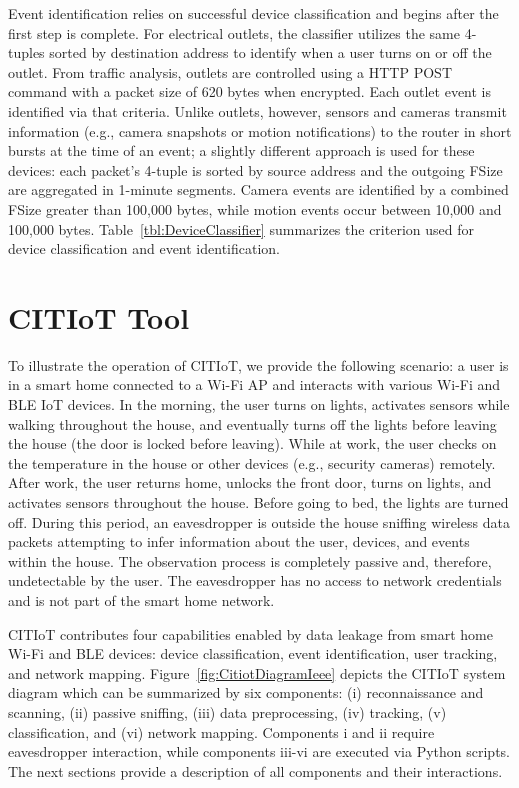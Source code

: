 \documentclass[journal]{./IEEEtran/IEEEtran}
\begin{document}
Event identification relies on successful device classification and begins after the first step is complete. For electrical outlets, the classifier utilizes the same 4-tuples sorted by destination address to identify when a user turns on or off the outlet. From traffic analysis, outlets are controlled using a HTTP POST command with a packet size of 620 bytes when encrypted. Each outlet event is identified via that criteria. Unlike outlets, however, sensors and cameras transmit information (e.g., camera snapshots or motion notifications) to the router in short bursts at the time of an event; a slightly different approach is used for these devices: each packet's 4-tuple is sorted by source address and the outgoing \ac{FSize} are aggregated in 1-minute segments. Camera events are identified by a combined \ac{FSize} greater than 100,000 bytes, while motion events occur between 10,000 and 100,000 bytes. Table~\ref{tbl:DeviceClassifier} summarizes the criterion used for device classification and event identification.

\tableDeviceClassifier

\section{\ac{CITIoT} Tool}\label{citiot}

To illustrate the operation of CITIoT, we provide the following scenario: a user is in a smart home connected to a Wi-Fi \ac{AP} and interacts with various Wi-Fi and \ac{BLE} \ac{IoT} devices. In the morning, the user turns on lights, activates sensors while walking throughout the house, and eventually turns off the lights before leaving the house (the door is locked before leaving). While at work, the user checks on the temperature in the house or other devices (e.g., security cameras) remotely. After work, the user returns home, unlocks the front door, turns on lights, and activates sensors throughout the house. Before going to bed, the lights are turned off. During this period, an eavesdropper is outside the house sniffing wireless data packets attempting to infer information about the user, devices, and events within the house. The observation process is completely passive and, therefore, undetectable by the user. The eavesdropper has no access to  network credentials and is not part of the smart home network. 

\ac{CITIoT} contributes four capabilities enabled by data leakage from smart home Wi-Fi and \ac{BLE} devices: device classification, event identification, user tracking, and network mapping. Figure~\ref{fig:CitiotDiagramIeee} depicts the \ac{CITIoT} system diagram which can be summarized by six components: (i) reconnaissance and scanning, (ii) passive sniffing, (iii) data preprocessing, (iv) tracking, (v) classification, and (vi) network mapping. Components i and ii require eavesdropper interaction, while components iii-vi are executed via Python scripts. The next sections provide a description of all components and their interactions.
\end{document}
